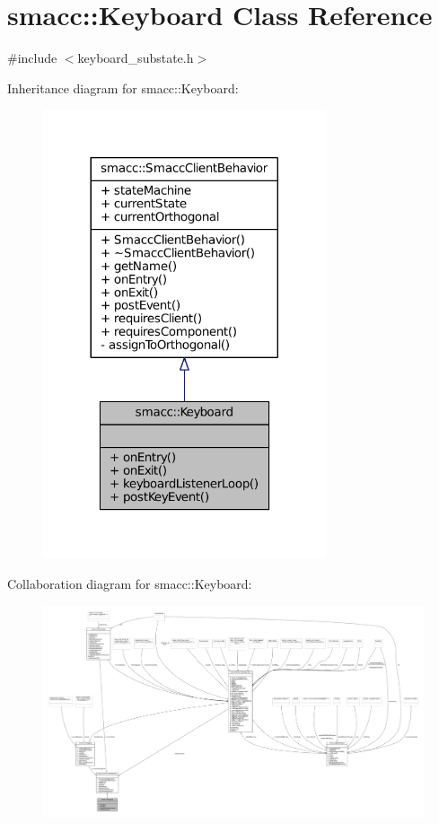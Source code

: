 \hypertarget{classsmacc_1_1Keyboard}{}\section{smacc\+:\+:Keyboard Class Reference}
\label{classsmacc_1_1Keyboard}


{\ttfamily \#include $<$keyboard\+\_\+substate.\+h$>$}



Inheritance diagram for smacc\+:\+:Keyboard\+:
\nopagebreak
\begin{figure}[H]
\begin{center}
\leavevmode
\includegraphics[width=236pt]{classsmacc_1_1Keyboard__inherit__graph}
\end{center}
\end{figure}


Collaboration diagram for smacc\+:\+:Keyboard\+:
\nopagebreak
\begin{figure}[H]
\begin{center}
\leavevmode
\includegraphics[width=350pt]{classsmacc_1_1Keyboard__coll__graph}
\end{center}
\end{figure}
